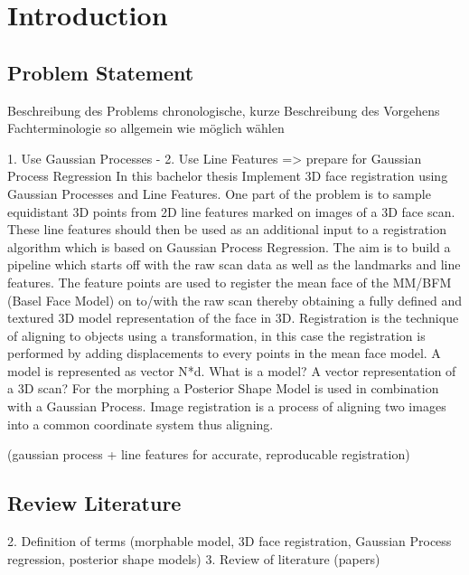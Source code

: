 \chapter{Introduction}

\section{Problem Statement}
Beschreibung des Problems
chronologische, kurze Beschreibung des Vorgehens
Fachterminologie so allgemein wie möglich wählen

1. Use Gaussian Processes - 2. Use Line Features => prepare for Gaussian Process Regression
In this bachelor thesis 
Implement 3D face registration using Gaussian Processes and Line Features. One part of the problem is to sample equidistant 3D points from 2D line features marked on images of a 3D face scan. These line features should then be used as an additional input to a registration algorithm which is based on Gaussian Process Regression. The aim is to build a pipeline which starts off with the raw scan data as well as the landmarks and line features. The feature points are used to register the mean face of the MM/BFM (Basel Face Model) on to/with the raw scan thereby obtaining a fully defined and textured 3D model representation of the face in 3D. Registration is the technique of aligning to objects using a transformation, in this case the registration is performed by adding displacements to every points in the mean face model.
A model is represented as vector N*d. What is a model? A vector representation of a 3D scan?
For the morphing a Posterior Shape Model is used in combination with a Gaussian Process.
Image registration is a process of aligning two images into a common coordinate system 
thus aligning.

(gaussian process + line features for accurate, reproducable registration)

\section{Review Literature}
	2. Definition of terms (morphable model, 3D face registration, Gaussian Process regression, posterior shape models)
	3. Review of literature (papers)


